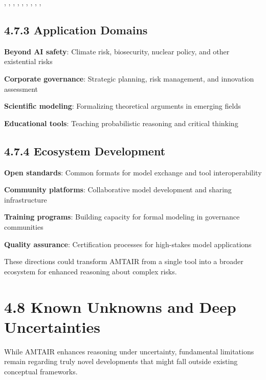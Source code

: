 \documentclass[
  11pt,
  letterpaper,
]{book}
\begin{document}
\textcite{babakov2025}, \textcite{ban2023}, \textcite{bethard2007},
\textcite{chen2023}, \textcite{duhem1954}, \textcite{heinze-deml2018},
\textcite{meyer2022b}, \textcite{squires2023}, \textcite{squires2023},
\textcite{yang2022}

\subsection*{4.7.3 Application Domains}\label{sec-application-future}

\textbf{Beyond AI safety}: Climate risk, biosecurity, nuclear policy,
and other existential risks

\textbf{Corporate governance}: Strategic planning, risk management, and
innovation assessment

\textbf{Scientific modeling}: Formalizing theoretical arguments in
emerging fields

\textbf{Educational tools}: Teaching probabilistic reasoning and
critical thinking

\subsection*{4.7.4 Ecosystem Development}\label{sec-ecosystem-future}

\textbf{Open standards}: Common formats for model exchange and tool
interoperability

\textbf{Community platforms}: Collaborative model development and
sharing infrastructure

\textbf{Training programs}: Building capacity for formal modeling in
governance communities

\textbf{Quality assurance}: Certification processes for high-stakes
model applications

These directions could transform AMTAIR from a single tool into a
broader ecosystem for enhanced reasoning about complex risks.

\section*{4.8 Known Unknowns and Deep
Uncertainties}\label{sec-deep-uncertainties}


While AMTAIR enhances reasoning under uncertainty, fundamental
limitations remain regarding truly novel developments that might fall
outside existing conceptual frameworks.
\end{document}
